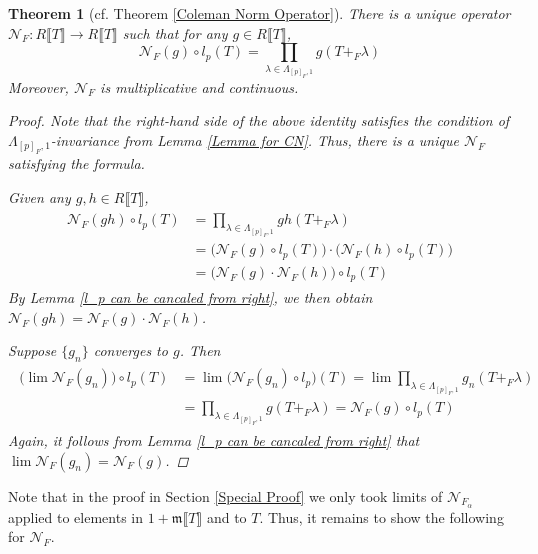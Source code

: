 \documentclass[12pt]{article}
\newtheorem{theorem}{Theorem}[section]
\theoremstyle{definition}
\newcommand{\PS}[1]{\llbracket #1 \rrbracket}
\def\CN{\mathscr{N}}
\def\m{\mathfrak{m}}
\begin{document}
    \begin{theorem} [{{cf. Theorem \ref{Coleman Norm Operator}}}] \label{generalized CN}
        There is a unique operator $\CN_F \colon R\PS{T} \to R\PS{T}$ such that for any $g \in R\PS{T}$, 
        \begin{equation*}
            \CN_F(g) \circ l_p (T) = \prod_{\lambda \in \Lambda_{[p]_F,1}}g(T +_F \lambda)
        \end{equation*}
        Moreover, $\CN_F$ is multiplicative and continuous. 
        \begin{proof}
            Note that the right-hand side of the above identity satisfies the condition of $\Lambda_{[p]_F,1}$-invariance from Lemma \ref{Lemma for CN}. Thus, there is a unique $\CN_F$ satisfying the formula. \par 
            Given any $g,h \in R\PS{T}$, 
            \begin{align*}
                \begin{split}
                    \CN_F(gh) \circ l_p(T) &= \prod_{\lambda \in \Lambda_{[p]_F,1}}gh(T +_F \lambda) \\ 
                    &= \bigl(\CN_F(g) \circ l_p(T)\bigr) \cdot \bigl(\CN_F(h) \circ l_p(T)\bigr) \\ 
                    &= \bigl(\CN_F(g) \cdot \CN_F(h)\bigr) \circ l_p(T) 
                \end{split}
            \end{align*}
            By Lemma \ref{l_p can be cancaled from right}, we then obtain $\CN_F(gh) = \CN_F(g) \cdot \CN_F(h)$. \par 
            Suppose $\{g_n\}$ converges to $g$. Then
            \begin{align*}
                \begin{split}
                    \bigl(\lim \CN_F(g_n)\bigr) \circ l_p(T) &= \lim \bigl(\CN_F(g_n) \circ l_p\bigr)(T) = \lim \prod_{\lambda \in \Lambda_{[p]_F,1}} g_n(T +_F \lambda) \\ 
                    &= \prod_{\lambda \in \Lambda_{[p]_F,1}} g(T +_F \lambda) = \CN_F(g) \circ l_p(T)
                \end{split}
            \end{align*}
            Again, it follows from Lemma \ref{l_p can be cancaled from right} that $\lim \CN_F(g_n) = \CN_F(g)$. 
        \end{proof}
    \end{theorem}
    Note that in the proof in Section \ref{Special Proof} we only took limits of $\CN_{F_\alpha}$ applied to elements in $1 + \m\PS{T}$ and to $T$. Thus, it remains to show the following for $\CN_F$. 
\end{document}
